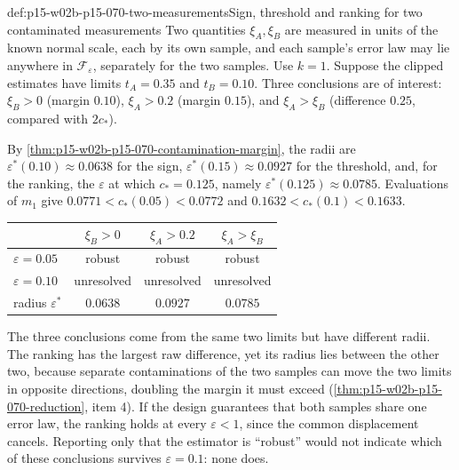 \begin{hbexample}{def:p15-w02b-p15-070-two-measurements}{Sign, threshold and ranking for two contaminated measurements}
Two quantities \(\xi_A,\xi_B\) are measured in units of the known normal
scale, each by its own sample, and each sample's error law may lie anywhere
in \(\mathcal F_\varepsilon\), separately for the two samples. Use
\(k=1\). Suppose the clipped estimates have limits \(t_A=0.35\) and
\(t_B=0.10\). Three conclusions are of interest: \(\xi_B>0\) (margin
\(0.10\)), \(\xi_A>0.2\) (margin \(0.15\)), and \(\xi_A>\xi_B\)
(difference \(0.25\), compared with \(2c_*\)).

By \cref{thm:p15-w02b-p15-070-contamination-margin}, the radii are
\(\varepsilon^*(0.10)\approx0.0638\) for the sign,
\(\varepsilon^*(0.15)\approx0.0927\) for the threshold, and, for the
ranking, the \(\varepsilon\) at which \(c_*=0.125\), namely
\(\varepsilon^*(0.125)\approx0.0785\). Evaluations of \(m_1\) give
\(0.0771<c_*(0.05)<0.0772\) and \(0.1632<c_*(0.1)<0.1633\).
\begin{center}
\begin{tabular}{lccc}
 & \(\xi_B>0\) & \(\xi_A>0.2\) & \(\xi_A>\xi_B\)\\\hline
 \(\varepsilon=0.05\) & robust & robust & robust\\
 \(\varepsilon=0.10\) & unresolved & unresolved & unresolved\\
 radius \(\varepsilon^*\) & \(0.0638\) & \(0.0927\) & \(0.0785\)
\end{tabular}
\end{center}
The three conclusions come from the same two limits but have different
radii. The ranking has the largest raw difference, yet its radius lies
between the other two, because separate contaminations of the two samples
can move the two limits in opposite directions, doubling the margin it
must exceed (\cref{thm:p15-w02b-p15-070-reduction}, item 4). If the
design guarantees that both samples share one error law, the ranking holds
at every \(\varepsilon<1\), since the common displacement cancels.
Reporting only that the estimator is \enquote{robust} would not indicate
which of these conclusions survives \(\varepsilon=0.1\): none does.
\end{hbexample}

